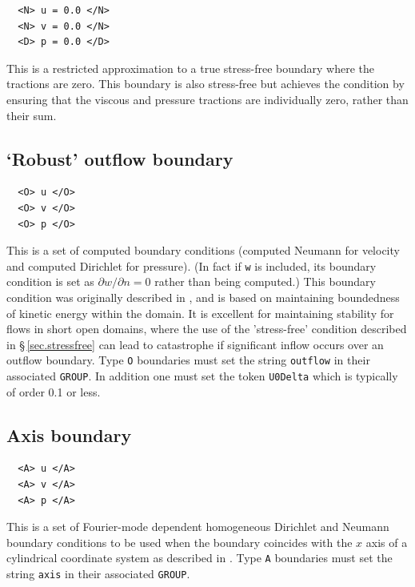 \documentclass[11pt]{report}
\begin{document}
{\small
\begin{verbatim}
  <N> u = 0.0 </N>
  <N> v = 0.0 </N>
  <D> p = 0.0 </D>
\end{verbatim}
}
\noindent This is a restricted approximation to a true stress-free
boundary where the tractions are zero. This boundary is also
stress-free but achieves the condition by ensuring that the viscous
and pressure tractions are individually zero, rather than their sum.

\subsection{`Robust' outflow boundary}
\label{sec.robust}

{\small
\begin{verbatim}
  <O> u </O>
  <O> v </O>
  <O> p </O>
\end{verbatim}
}
\noindent This is a set of computed boundary conditions (computed
Neumann for velocity and computed Dirichlet for pressure).  (In fact
if \verb+w+ is included, its boundary condition is set as $\partial
w/\partial n=0$ rather than being computed.) This boundary condition
was originally described in \citet{dkc14}, and is based on maintaining
boundedness of kinetic energy within the domain.  It is excellent for
maintaining stability for flows in short open domains, where the use
of the 'stress-free' condition described in \S\,\ref{sec.stressfree}
can lead to catastrophe if significant inflow occurs over an outflow
boundary.  Type \verb|O| boundaries must set the string \verb|outflow|
in their associated \verb|GROUP|.  In addition one must set the token
\verb+U0Delta+ \citep[see eq.\ 4 of][this is $U_o\delta$]{dkc14}
which is typically of order 0.1 or less.

\subsection{Axis boundary}

{\small
\begin{verbatim}
  <A> u </A>
  <A> v </A>
  <A> p </A>
\end{verbatim}
}
\noindent
This is a set of Fourier-mode dependent homogeneous Dirichlet and
Neumann boundary conditions to be used when the boundary coincides
with the $x$ axis of a cylindrical coordinate system as described in
\citet{blsh04}. Type \verb|A| boundaries must set the string
\verb|axis| in their associated \verb|GROUP|.
\end{document}
